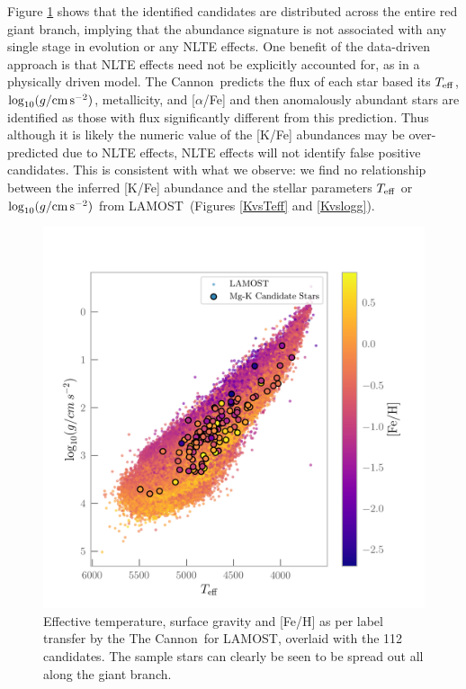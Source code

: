 \documentclass[a4paper,fleqn,usenatbib]{mnras}
\newcommand{\project}[1]{#1}
\newcommand{\lamost}{\project{LAMOST}}
\newcommand{\tc}{\project{The Cannon}}
\newcommand{\teff}{T_{\rm eff}}
\newcommand{\logg}{\log_{10}(g/{\rm cm\,s}^{-2})}
\begin{document}
Figure \ref{loggTeffFeh} shows that the identified candidates are distributed across the entire red giant branch, implying that the abundance signature is not associated with any single stage in evolution or any NLTE effects. One benefit of the data-driven approach is that NLTE effects need not be explicitly accounted for, as in a physically driven model. \tc\ predicts the flux of each star based its $\teff$, $\logg$, metallicity, and [$\alpha$/Fe] and then anomalously abundant stars are identified as those with flux significantly different from this prediction. Thus although it is likely the numeric value of the [K/Fe] abundances may be over-predicted due to NLTE effects, NLTE effects will not identify false positive candidates. This is consistent with what we observe: we find no relationship between the inferred [K/Fe] abundance and the stellar parameters $\teff$ or $\logg$ from \lamost\ (Figures \ref{KvsTeff} and \ref{Kvslogg}).





\begin{figure}
	\includegraphics[width=\columnwidth]{loggTeffFeH.png}
    \caption{Effective temperature, surface gravity and [Fe/H] as per label transfer by the \tc\ for LAMOST, overlaid with the 112 candidates. The sample stars can clearly be seen to be spread out all along the giant branch.}
    \label{loggTeffFeh}
\end{figure}
\end{document}
